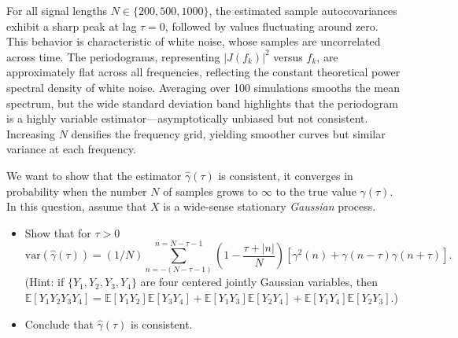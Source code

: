 \documentclass[11pt]{article}
\begin{document}
\begin{solution}
For all signal lengths $N \in \{200, 500, 1000\}$, the estimated sample autocovariances exhibit a sharp peak at lag $\tau = 0$, followed by values fluctuating around zero. This behavior is characteristic of white noise, whose samples are uncorrelated across time. The periodograms, representing $|J(f_k)|^2$ versus $f_k$, are approximately flat across all frequencies, reflecting the constant theoretical power spectral density of white noise. Averaging over 100 simulations smooths the mean spectrum, but the wide standard deviation band highlights that the periodogram is a highly variable estimator---asymptotically unbiased but not consistent. Increasing $N$ densifies the frequency grid, yielding smoother curves but similar variance at each frequency.

\end{solution}


\begin{exercise}
    We want to show that the estimator $\hat{\gamma}(\tau)$ is consistent, \ie it converges in probability when the number $N$ of samples grows to $\infty$ to the true value ${\gamma}(\tau)$.
    In this question, assume that $X$ is a wide-sense stationary \textit{Gaussian} process.
    \begin{itemize}
        \item Show that for $\tau>0$ 
    \begin{equation}
       \text{var}(\hat{\gamma}(\tau)) = (1/N) \sum_{n=-(N-\tau-1)}^{n=N-\tau-1} \left(1 - \frac{\tau + |n|}{N}\right) \left[\gamma^2(n) + \gamma(n-\tau)\gamma(n+\tau)\right].
    \end{equation}
    (Hint: if $\{Y_1, Y_2, Y_3, Y_4\}$ are four centered jointly Gaussian variables, then $\mathbb{E}[Y_1 Y_2 Y_3 Y_4] = \mathbb{E}[Y_1 Y_2]\mathbb{E}[Y_3 Y_4] + \mathbb{E}[Y_1 Y_3]\mathbb{E}[Y_2 Y_4] + \mathbb{E}[Y_1 Y_4]\mathbb{E}[Y_2 Y_3]$.) 
    \item Conclude that $\hat{\gamma}(\tau)$ is consistent.
    \end{itemize}
\end{exercise}
\end{document}
